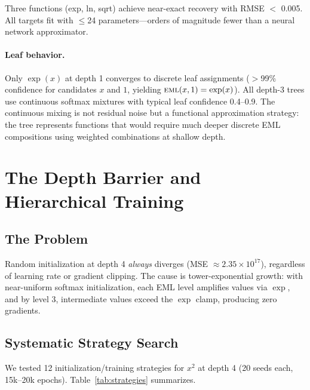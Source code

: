 \documentclass[11pt,a4paper]{article}
\newcommand{\eml}{\textsc{eml}}
\begin{document}
Three functions (exp, ln, sqrt) achieve near-exact recovery with RMSE $<$ 0.005.
All targets fit with $\leq$24 parameters---orders of magnitude fewer than a neural network approximator.

\paragraph{Leaf behavior.}
Only $\exp(x)$ at depth 1 converges to discrete leaf assignments ($>$99\% confidence for candidates $x$ and $1$, yielding $\eml(x, 1) = \exp(x)$).
All depth-3 trees use continuous softmax mixtures with typical leaf confidence 0.4--0.9.
The continuous mixing is not residual noise but a functional approximation strategy: the tree represents functions that would require much deeper discrete EML compositions using weighted combinations at shallow depth.

\section{The Depth Barrier and Hierarchical Training}
\label{sec:depth}

\subsection{The Problem}

Random initialization at depth 4 \emph{always} diverges (MSE $\approx 2.35 \times 10^{17}$), regardless of learning rate or gradient clipping.
The cause is tower-exponential growth: with near-uniform softmax initialization, each EML level amplifies values via $\exp$, and by level 3, intermediate values exceed the $\exp$ clamp, producing zero gradients.

\subsection{Systematic Strategy Search}

We tested 12 initialization/training strategies for $x^2$ at depth 4 (20 seeds each, 15k--20k epochs).
Table~\ref{tab:strategies} summarizes.
\end{document}
